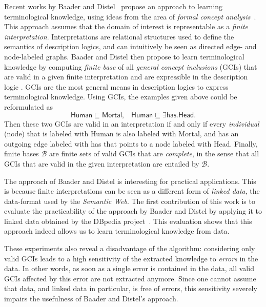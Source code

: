 \documentclass[english,fleqn]{scrartcl}
\begin{document}
Recent works by Baader and Distel~\cite{Diss-Felix} propose an approach to learning
terminological knowledge, using ideas from the area of \emph{formal concept
  analysis}~\cite{fca-book}.  This approach assumes that the domain of interest is
representable as a \emph{finite interpretation}.  Interpretations are relational
structures used to define the semantics of description logics, and can intuitively be seen
as directed edge- and node-labeled graphs.  Baader and Distel then propose to learn
terminological knowledge by computing \emph{finite base} of all \emph{general concept
  inclusions} (GCIs) that are valid in a given finite interpretation and are expressible
in the description logic \ELbot.  GCIs are the most general means in description logics to
express terminological knowledge.  Using GCIs, the examples given above could be
reformulated as
\begin{equation*}
  \mathsf{Human} \sqsubseteq \mathsf{Mortal}, \;\;\; \mathsf{Human} \sqsubseteq \exists
  \mathsf{has}. \mathsf{Head}.
\end{equation*}
Then these two GCIs are valid in an interpretation if and only if every \emph{individual}
(node) that is labeled with \textsf{Human} is also labeled with \textsf{Mortal}, and has
an outgoing edge labeled with \textsf{has} that points to a node labeled with
\textsf{Head}.  Finally, finite bases $\mathcal{B}$ are finite sets of valid GCIs that are
\emph{complete}, in the sense that all GCIs that are valid in the given interpretation are
entailed by $\mathcal{B}$.

The approach of Baader and Distel is interesting for practical applications.  This is
because finite interpretations can be seen as a different form of \emph{linked data}, the
data-format used by the \emph{Semantic Web}.  The first contribution of this work is to
evaluate the practicability of the approach by Baader and Distel by applying it to linked
data obtained by the DBpedia project~\cite{DBpedia}.  This evaluation shows that this
approach indeed allows us to learn terminological knowledge from data.

These experiments also reveal a disadvantage of the algorithm: considering only valid GCIs
leads to a high sensitivity of the extracted knowledge to \emph{errors} in the data.  In
other words, as soon as a single error is contained in the data, all valid GCIs affected
by this error are not extracted anymore.  Since one cannot assume that data, and linked
data in particular, is free of errors, this sensitivity severely impairs the usefulness of
Baader and Distel's approach.
\end{document}
